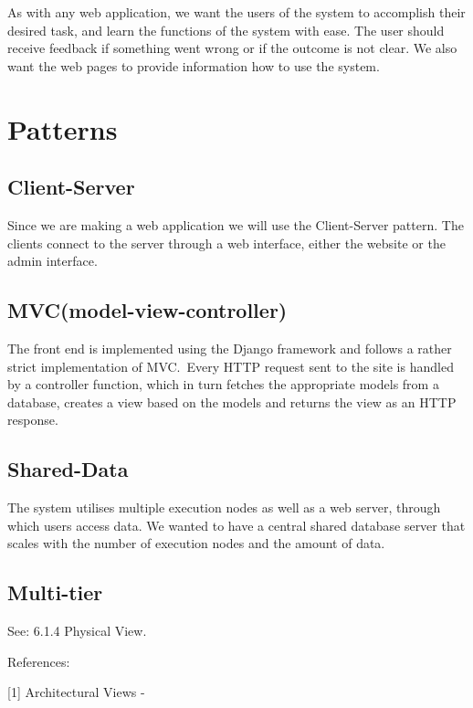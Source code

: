 As with any web application, we want the users of the system to
accomplish their desired task, and learn the functions of the system
with ease. The user should receive feedback if something went wrong or
if the outcome is not clear. We also want the web pages to provide
information how to use the system. \ 

\section{Patterns}

\subsection{Client-Server}

Since we are making a web application we will use the Client-Server
pattern. The clients connect to the server through a web interface,
either the website or the admin interface. 

\subsection{MVC(model-view-controller)}

The front end is implemented using the Django framework and follows a
rather strict implementation of MVC.\ Every HTTP request sent to the
site is handled by a controller function, which in turn fetches the
appropriate models from a database, creates a view based on the models
and returns the view as an HTTP response. 

\subsection{Shared-Data}

The system utilises multiple execution nodes as well as a web server,
through which users access data. We wanted to have a central shared
database server that scales with the number of execution nodes and the
amount of data. 

\subsection{Multi-tier}

See: 6.1.4 Physical View.







References:

[1] Architectural Views -

